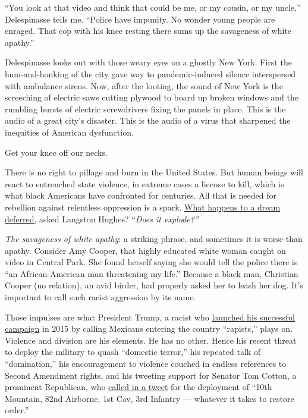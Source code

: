 ``You look at that video and think that could be me, or my cousin, or my
uncle,'' Delespinasse tells me. ``Police have impunity. No wonder young
people are enraged. That cop with his knee resting there sums up the
savageness of white apathy.''

Delespinasse looks out with those weary eyes on a ghostly New York.
First the hum-and-honking of the city gave way to pandemic-induced
silence interspersed with ambulance sirens. Now, after the looting, the
sound of New York is the screeching of electric saws cutting plywood to
board up broken windows and the rumbling bursts of electric screwdrivers
fixing the panels in place. This is the audio of a great city's
disaster. This is the audio of a virus that sharpened the inequities of
American dysfunction.

Get your knee off our necks.

There is no right to pillage and burn in the United States. But human
beings will react to entrenched state violence, in extreme cases a
license to kill, which is what black Americans have confronted for
centuries. All that is needed for rebellion against relentless
oppression is a spark.
\href{https://www.poetryfoundation.org/poems/46548/harlem}{What happens
to a dream deferred,} asked Langston Hughes? ``\emph{Does it explode?''}

\emph{The savageness of white apathy}: a striking phrase, and sometimes
it is worse than apathy. Consider Amy Cooper, that highly educated white
woman caught on video in Central Park. She found herself saying she
would tell the police there is ``an African-American man threatening my
life.'' Because a black man, Christian Cooper (no relation), an avid
birder, had properly asked her to leash her dog. It's important to call
such racist aggression by its name.

Those impulses are what President Trump, a racist who
\href{https://www.washingtonpost.com/news/the-fix/wp/2017/06/16/theyre-rapists-presidents-trump-campaign-launch-speech-two-years-later-annotated/}{launched
his successful campaign} in 2015 by calling Mexicans entering the
country ``rapists,'' plays on. Violence and division are his elements.
He has no other. Hence his recent threat to deploy the military to quash
``domestic terror,'' his repeated talk of ``domination,'' his
encouragement to violence couched in endless references to Second
Amendment rights, and his tweeting support for Senator Tom Cotton, a
prominent Republican, who
\href{https://twitter.com/TomCottonAR/status/1267459561675468800}{called
in a tweet} for the deployment of ``10th Mountain, 82nd Airborne, 1st
Cav, 3rd Infantry --- whatever it takes to restore order.''


